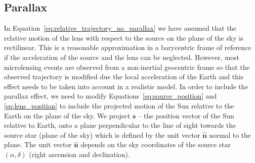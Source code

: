 \documentclass[11pt]{report}
\begin{document}
\subsection{Parallax}
In Equation~\ref{eq:relative_trajectory_no_parallax} we have assumed that the
relative motion of the lens with respect to the source on the plane of the sky
is rectilinear. This is a reasonable approximation in a barycentric frame of
reference if the acceleration of the source and the lens can be neglected.
However, most microlensing events are observed from a non-inertial geocentric
frame so that the observed trajectory is modified due the local acceleration of
the Earth and this effect needs to be taken into account in a realistic model.
In order to include the parallax effect, we need to modify
Equations~\ref{eq:source_position} and \ref{eq:lens_position} to include the
projected motion of the Sun relative to the Earth on the plane of the sky. We
project $\mathbf s$ -- the position vector of the Sun relative to Earth, onto a
plane perpendicular to the line of sight towards the source star (plane of the
sky) which is defined by the unit vector $\boldsymbol{\hat n}$ normal to the
plane. The unit vector $\boldsymbol{\hat n}$ depends on the sky coordinates of
the source star $(\alpha,\delta)$ (right ascension and declination).
\end{document}
